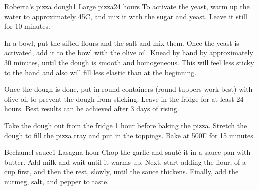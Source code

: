 \documentclass{article}
\begin{document}
\begin{recipe}{Roberta's pizza dough}{1 Large pizza}{24 hours}
  To activate the yeast, warm up the water to approximately 45\degrees{}C, and
  mix it with the sugar and yeast. Leave it still for 10 minutes.

  In a bowl, put the sifted flours and the salt and mix them. Once the yeast is
  activated, add it to the bowl with the olive oil. Knead by hand by
  approximately 30 minutes, until the dough is smooth and homogeneous. This will
  feel less sticky to the hand and also will fill less elastic than at the beginning.

  \freeform
  Once the dough is done, put in round containers (round tuppers work best) with
  olive oil to prevent the dough from sticking. Leave in the fridge for at least
  24 hours. Best results can be achieved after 3 days of rising.

  Take the dough out from the fridge 1 hour before baking the pizza. Stretch the
  dough to fill the pizza tray and put in the toppings. Bake at 500\degrees{}F
  for 15 minutes.
  

\end{recipe}

\begin{recipe}{Bechamel sauce}{1 Lasagna}{ hour}
  Chop the garlic and saut\'{e} it in a sauce pan with butter. Add milk and wait
  until it warms up. Next, start adding the flour,  of a cup first, and then the
  rest, slowly, until the sauce thickens. Finally, add the nutmeg, salt, and
  pepper to taste.


\end{recipe}
\end{document}
